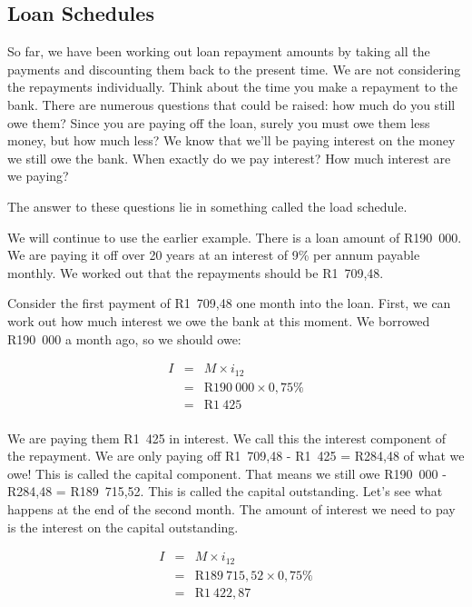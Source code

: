 \subsection{Loan Schedules}
\label{ss:loadschedules}

So far, we have been working out loan repayment amounts by taking all the payments and discounting them back to the present time. We are not considering the repayments individually. Think about the time you make a repayment to the bank. There are numerous questions that could be raised: how much do you still owe them? Since you are paying off the loan, surely you must owe them less money, but how much less? We know that we'll be paying interest on the money we still owe the bank. When exactly do we pay interest? How much interest are we paying?

The answer to these questions lie in something called the load schedule.

We will continue to use the earlier example. There is a loan amount of R190~000. We are paying it off over 20 years at an interest of 9\% per annum payable monthly. We worked out that the repayments should be R1~709,48.

Consider the first payment of R1~709,48 one month into the loan. First, we can work out how much interest we owe the bank at this moment. We borrowed R190~000 a month ago, so we should owe:

\begin{eqnarray*}
I &=& M \times i_{12}\\
&=& \mbox{R}190~000 \times 0,75\%\\
&=& \mbox{R}1~425\\
\end{eqnarray*}

We are paying them R1~425 in interest. We call this the interest component of the repayment. We are only paying off R1~709,48 - R1~425 = R284,48 of what we owe! This is called the capital component. That means we still owe R190~000 - R284,48 = R189~715,52. This is called the capital outstanding. Let's see what happens at the end of the second month. The amount of interest we need to pay is the interest on the capital outstanding.

\begin{eqnarray*}
I &=& M \times i_{12}\\
&=& \mbox{R}189~715,52 \times 0,75\%\\
&=& \mbox{R}1~422,87\\
\end{eqnarray*}

